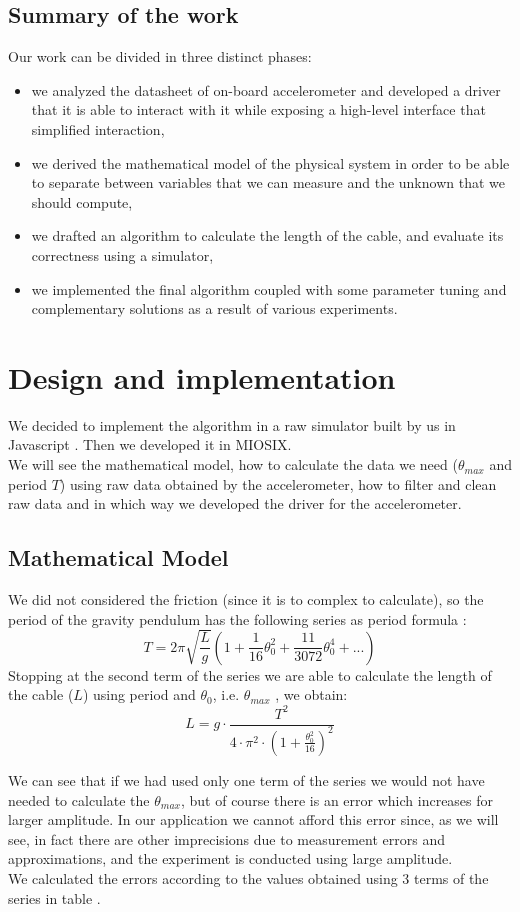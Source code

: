 \subsection{Summary of the work}
Our work can be divided in three distinct phases:
\begin{itemize}
	\item we analyzed the datasheet of on-board accelerometer and developed a driver that it is able to interact with it while exposing a high-level interface that simplified interaction,
	\item we derived the mathematical model of the physical system in order to be able to separate between variables that we can measure and the unknown that we should compute,
	\item we drafted an algorithm to calculate the length of the cable, and evaluate its correctness using a simulator,
	\item we implemented the final algorithm coupled with some parameter tuning and complementary solutions as a result of various experiments. 
\end{itemize}
\pagebreak

\section{Design and implementation}
We decided to implement the algorithm in a raw simulator built by us in Javascript \cite{javascriptPrototype}. Then we developed it in MIOSIX.\\
We will see the mathematical model, how to calculate the data we need ($\theta_{max}$ and period $T$) using raw data obtained by the accelerometer, how to filter and clean raw data and in which way we developed the driver for the accelerometer.

\subsection{Mathematical Model}
\label{sec:mathmodel}
We did not considered the friction (since it is to complex to calculate), so the period of the gravity pendulum has the following series as period formula \cite{pendulumSeries}: 
$$T = 2 \pi \sqrt{\frac{L}{g}} \left(1 + \frac{1}{16} \theta_0^2 + \frac{11}{3072} \theta_0^4 + ...\right)$$
Stopping at the second term of the series we are able to calculate the length of the cable ($L$) using period and $\theta_0$, i.e. $\theta_{max}$ , we obtain:
$$ L = g \cdot \frac{T^2}{4 \cdot \pi^2 \cdot \left(1 + \frac{\theta_0^2}{16}\right)^2}$$
\par
We can see that if we had used only one term of the series we would not have needed to calculate the $\theta_{max}$, but of course there is an error which increases for larger amplitude. In our application we cannot afford this error since, as we will see, in fact there are other imprecisions due to measurement errors and approximations, and the experiment is conducted using large amplitude.\\
We calculated the errors according to the values obtained using 3 terms of the series in table .  

